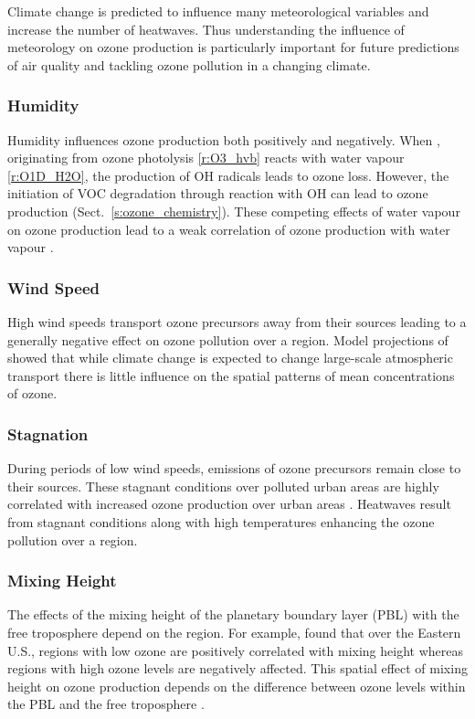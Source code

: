Climate change is predicted to influence many meteorological variables and increase the number of heatwaves.
Thus understanding the influence of meteorology on ozone production is particularly important for future predictions of air quality and tackling ozone pollution in a changing climate.

\subsubsection{Humidity}
Humidity influences ozone production both positively and negatively.
When , originating from ozone photolysis \eqref{r:O3_hvb} reacts with water vapour \eqref{r:O1D_H2O}, the production of OH radicals leads to ozone loss.
However, the initiation of VOC degradation through reaction with OH can lead to ozone production (Sect.~\ref{s:ozone_chemistry}).
These competing effects of water vapour on ozone production lead to a weak correlation of ozone production with water vapour \citep{Jacob:2009}.

\subsubsection{Wind Speed}
High wind speeds transport ozone precursors away from their sources leading to a generally negative effect on ozone pollution over a region.
Model projections of \citet{Doherty:2013} showed that while climate change is expected to change large-scale atmospheric transport there is little influence on the spatial patterns of mean concentrations of ozone.

\subsubsection{Stagnation}
During periods of low wind speeds, emissions of ozone precursors remain close to their sources.
These stagnant conditions over polluted urban areas are highly correlated with increased ozone production over urban areas \citep{Jacob:2009}.
Heatwaves result from stagnant conditions along with high temperatures enhancing the ozone pollution over a region.

\subsubsection{Mixing Height}
The effects of the mixing height of the planetary boundary layer (PBL) with the free troposphere depend on the region.
For example, \citet{Dawson:2007} found that over the Eastern U.S., regions with low ozone are positively correlated with mixing height whereas regions with high ozone levels are negatively affected.
This spatial effect of mixing height on ozone production depends on the difference between ozone levels within the PBL and the free troposphere \citep{Jacob:2009}.

